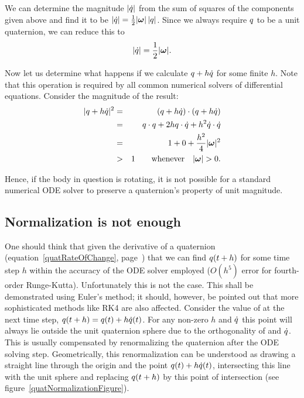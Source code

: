 We can determine the magnitude $|\dot{q}|$ from the sum of squares of the
components given above and find it to be
$\norm{\dot{\q{q}}} = \frac{1}{2}\norm{\ve{\omega}}\,\norm{\q{q}}$. Since we always
require $q$ to be a unit quaternion, we can reduce this to
\begin{equation}
\label{quatRateOfChangeMagnitude}
\norm{\dot{\q{q}}} = \frac{1}{2}\norm{\ve{\omega}}.
\end{equation}

Now let us determine what happens if we calculate $q + h\dot{q}$ for some finite $h$.
Note that this operation is required by all common numerical solvers of differential equations.
Consider the magnitude of the result:
\begin{eqnarray*}
\norm{\q{q} + h\dot{\q{q}}}^2 & = & (\q{q} + h\dot{\q{q}})\cdot(\q{q} + h\dot{\q{q}}) \\
&=& \q{q}\cdot\q{q} + 2h\q{q}\cdot\dot{\q{q}} + h^2\dot{\q{q}}\cdot\dot{\q{q}} \\
&=& 1 + 0 + \frac{h^2}{4}\norm{\ve{\omega}}^2 \\
&>& 1 \quad\quad\mbox{whenever}\quad \norm{\ve{\omega}} > 0.
\end{eqnarray*}

Hence, if the body in question is rotating, it is not possible for a standard numerical ODE solver
to preserve a quaternion's property of unit magnitude.


\subsection{Normalization is not enough\label{quatNormalization}}

One should think that given the derivative of a quaternion  (equation~\ref{quatRateOfChange},
page~\pageref{quatRateOfChange}) that we can find $q(t + h)$ for some time step $h$ within
the accuracy of the ODE solver employed ($O(h^5)$ error for fourth-order Runge-Kutta).
Unfortunately this is not the case. This shall be demonstrated using Euler's method; it should,
however, be pointed out that more sophisticated methods like RK4 are also affected. Consider the
value of  at the next time step, $q(t + h) = q(t) + h \dot{q}(t)$. For any
non-zero $h$ and $\dot{q}$ this point will always lie outside the unit quaternion sphere due
to the orthogonality of  and $\dot{q}$. This is usually compensated by renormalizing
the quaternion after the ODE solving step. Geometrically, this renormalization can be understood
as drawing a straight line through the origin and the point $q(t) + h \dot{q}(t)$,
intersecting this line with the unit sphere and replacing $q(t + h)$ by this point of
intersection (see figure~\ref{quatNormalizationFigure}).

